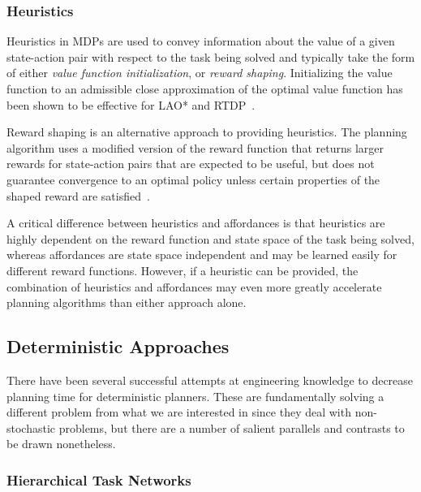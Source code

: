 \documentclass[conference]{IEEEtran}
\newcommand{\dnote}[1]{\textcolor{Green}{\textbf{}}}
\begin{document}
\dnote{Policy priors addition?}

\subsubsection{Heuristics}
Heuristics in MDPs are used to convey information about the value of a given state-action
pair with respect to the task being solved and typically take the form of either {\em value function initialization},
or {\em reward shaping}. Initializing the value function to an admissible close approximation of the optimal
value function has been shown to be effective for LAO* and RTDP~\cite{Hansen:1999qf}.

Reward shaping is an alternative approach to providing heuristics. The planning algorithm
uses a modified version of the reward function that returns larger rewards for state-action
pairs that are expected to be useful, but does not guarantee convergence to an optimal
policy unless certain properties of the shaped reward are satisfied~\cite{potshap}.

A critical difference between heuristics and affordances is that heuristics are highly dependent
on the reward function and state space of the task being solved, whereas affordances are state
space independent and may be learned easily for different reward functions. However, if a heuristic
can be provided, the combination of heuristics and affordances may even more greatly accelerate
planning algorithms than either approach alone.

\subsection{Deterministic Approaches}

There have been several successful attempts at engineering knowledge to
decrease planning time for deterministic planners. These are fundamentally solving
a different problem from what we are interested in since they deal with non-stochastic problems, but there are a number of salient parallels and contrasts to be drawn nonetheless.

\subsubsection{Hierarchical Task Networks}

\dnote{I think we should have a shoutout to Branavan's Learning High Level Plans from Text paper in this section (and include subgoal planning as part of this section}
\end{document}
